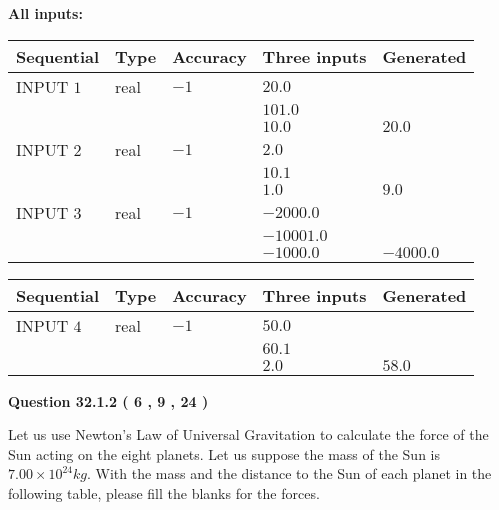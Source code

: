\documentclass[12pt]{article}
\begin{document}
   
   
   
\noindent\vspace{0.1in}\hspace{-0.08in} {\textbf{\Large{All inputs: }}}
   
   
  
  
\noindent\begin{tabular}{|l|l|l|l|l|}
\hline
 Sequential & Type & Accuracy & Three inputs & Generated \\ 
\hline
 
 
  INPUT $            1 $ & real & $           -1  $ & $
 20.0
  $ & \\
  & & &  $
 101.0
  $ & \\
  & & &  $
 10.0
 $ & $ 20.0 $ 
 \\  \hline  
 
 
  INPUT $            2 $ & real & $           -1  $ & $
 2.0
  $ & \\
  & & &  $
 10.1
  $ & \\
  & & &  $
 1.0
 $ & $ 9.0 $ 
 \\  \hline  
 
 
  INPUT $            3 $ & real & $           -1  $ & $
 -2000.0
  $ & \\
  & & &  $
 -10001.0
  $ & \\
  & & &  $
 -1000.0
 $ & $ -4000.0 $ 
 \\  \hline  
 \end{tabular}
   
   
  
  
\noindent\begin{tabular}{|l|l|l|l|l|}
\hline
 Sequential & Type & Accuracy & Three inputs & Generated \\ 
\hline
 
 
  INPUT $            4 $ & real & $           -1  $ & $
 50.0
  $ & \\
  & & &  $
 60.1
  $ & \\
  & & &  $
 2.0
 $ & $ 58.0 $ 
 \\  \hline  
 \end{tabular}
   
   
  
\vspace{0.2in}
  
{\textbf{\Large{Question
32.1.2 
 (           6 ,           9 ,          24 )
}}}
  
  
Let us use Newton's Law of Universal Gravitation to calculate the force
of the Sun acting on the eight planets. Let us suppose the mass of the
Sun is $ %
7.00 \times 10^{24} kg$. With the mass and the
distance to the Sun of each planet in the following table, please fill
the blanks for the forces.
 
\end{document}
